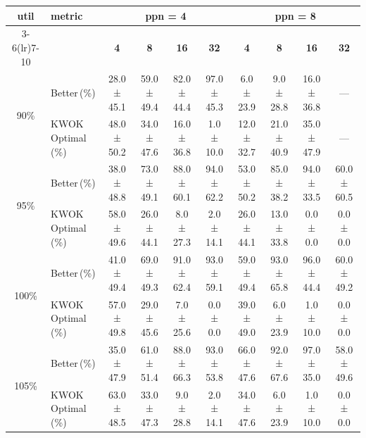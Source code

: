\begin{tabular}{@{}c l *{8}{c}@{}}
\toprule
\multirow{2}{*}{\textbf{util}} & \multirow{2}{*}{\textbf{metric}} &\multicolumn{4}{c}{\textbf{ppn = 4}} & \multicolumn{4}{c}{\textbf{ppn = 8}}\\
\cmidrule(lr){3-6}\cmidrule(lr){7-10}
 &  & \textbf{4} & \textbf{8} & \textbf{16} & \textbf{32} & \textbf{4} & \textbf{8} & \textbf{16} & \textbf{32}\\
\midrule
\multirow{2}{*}{90\%}
& Better\,(\%) & 28.0 ± 45.1 & 59.0 ± 49.4 & 82.0 ± 44.4 & 97.0 ± 45.3 & 6.0 ± 23.9 & 9.0 ± 28.8 & 16.0 ± 36.8 & \multicolumn{1}{c}{—} \\
& KWOK\,Optimal\,(\%) & 48.0 ± 50.2 & 34.0 ± 47.6 & 16.0 ± 36.8 & 1.0 ± 10.0 & 12.0 ± 32.7 & 21.0 ± 40.9 & 35.0 ± 47.9 & \multicolumn{1}{c}{—} \\
\midrule
\multirow{2}{*}{95\%}
& Better\,(\%) & 38.0 ± 48.8 & 73.0 ± 49.1 & 88.0 ± 60.1 & 94.0 ± 62.2 & 53.0 ± 50.2 & 85.0 ± 38.2 & 94.0 ± 33.5 & 60.0 ± 60.5 \\
& KWOK\,Optimal\,(\%) & 58.0 ± 49.6 & 26.0 ± 44.1 & 8.0 ± 27.3 & 2.0 ± 14.1 & 26.0 ± 44.1 & 13.0 ± 33.8 & 0.0 ± 0.0 & 0.0 ± 0.0 \\
\midrule
\multirow{2}{*}{100\%}
& Better\,(\%) & 41.0 ± 49.4 & 69.0 ± 49.3 & 91.0 ± 62.4 & 93.0 ± 59.1 & 59.0 ± 49.4 & 93.0 ± 65.8 & 96.0 ± 44.4 & 60.0 ± 49.2 \\
& KWOK\,Optimal\,(\%) & 57.0 ± 49.8 & 29.0 ± 45.6 & 7.0 ± 25.6 & 0.0 ± 0.0 & 39.0 ± 49.0 & 6.0 ± 23.9 & 1.0 ± 10.0 & 0.0 ± 0.0 \\
\midrule
\multirow{2}{*}{105\%}
& Better\,(\%) & 35.0 ± 47.9 & 61.0 ± 51.4 & 88.0 ± 66.3 & 93.0 ± 53.8 & 66.0 ± 47.6 & 92.0 ± 67.6 & 97.0 ± 35.0 & 58.0 ± 49.6 \\
& KWOK\,Optimal\,(\%) & 63.0 ± 48.5 & 33.0 ± 47.3 & 9.0 ± 28.8 & 2.0 ± 14.1 & 34.0 ± 47.6 & 6.0 ± 23.9 & 1.0 ± 10.0 & 0.0 ± 0.0 \\
\bottomrule
\end{tabular}
